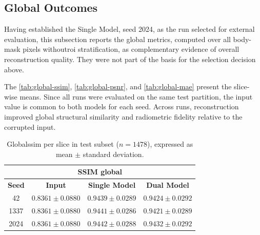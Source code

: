 \subsection{Global Outcomes}
\label{sec:global-outcomes}

Having established the Single Model, seed 2024, as the run selected for external evaluation, this subsection reports the global metrics, computed over all body-mask pixels without\acrshort{roi} stratification, as complementary evidence of overall reconstruction quality. They were not part of the basis for the selection decision above.

The \autoref{tab:global-ssim}, \autoref{tab:global-psnr}, and \autoref{tab:global-mae} present the slice-wise means. Since all runs were evaluated on the same test partition, the input value is common to both models for each seed. Across runs, reconstruction improved global structural similarity and radiometric fidelity relative to the corrupted input.

\begin{table}[htbp]
    \centering
    
    \begin{tabular}{cccc}
        \multicolumn{4}{c}{\textbf{SSIM global}} \\[4pt]
        \hline
        \textbf{Seed} & \textbf{Input} & \textbf{Single Model} & \textbf{Dual Model} \\
        \hline
        42   & $0.8361 \pm 0.0880$ & $0.9439 \pm 0.0289$ & $0.9424 \pm 0.0292$ \\
        1337 & $0.8361 \pm 0.0880$ & $0.9441 \pm 0.0286$ & $0.9421 \pm 0.0289$ \\
        2024 & $0.8361 \pm 0.0880$ & $0.9442 \pm 0.0288$ & $0.9432 \pm 0.0292$ \\
        \hline
    \end{tabular}
    \captionsetup{skip=2pt}
    \caption[Per-slice global SSIM on the test set]{Global\acrshort{ssim} per slice in test subset ($n=1478$), expressed as mean $\pm$ standard deviation.}
    \label{tab:global-ssim}
\end{table}

